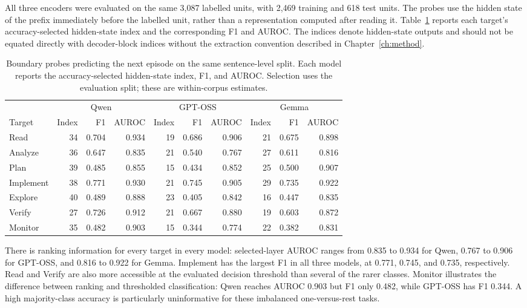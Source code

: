 \documentclass[12pt,a4paper,twoside,openright]{book}
\begin{document}
All three encoders were evaluated on the same 3,087 labelled units, with
2,469 training and 618 test units. The probes use the hidden state of the
prefix immediately before the labelled unit, rather than a representation
computed after reading it. Table~\ref{tab:res-probes} reports each target's
accuracy-selected hidden-state index and the corresponding F1 and AUROC.
The indices denote hidden-state outputs and should not be equated directly
with decoder-block indices without the extraction convention described in
Chapter~\ref{ch:method}.

\begin{table}[!ht]
\centering\small
\caption{Boundary probes predicting the next episode on the same sentence-level split. Each model reports the accuracy-selected hidden-state index, F1, and AUROC. Selection uses the evaluation split; these are within-corpus estimates.}
\label{tab:res-probes}
\begin{adjustbox}{max width=\linewidth}%
\begin{tabular}{lrrrrrrrrr}
\toprule
 & \multicolumn{3}{c}{Qwen} & \multicolumn{3}{c}{GPT-OSS} & \multicolumn{3}{c}{Gemma} \\ Target & Index & F1 & AUROC & Index & F1 & AUROC & Index & F1 & AUROC \\
\midrule
Read & 34 & 0.704 & 0.934 & 19 & 0.686 & 0.906 & 21 & 0.675 & 0.898 \\
Analyze & 36 & 0.647 & 0.835 & 21 & 0.540 & 0.767 & 27 & 0.611 & 0.816 \\
Plan & 39 & 0.485 & 0.855 & 15 & 0.434 & 0.852 & 25 & 0.500 & 0.907 \\
Implement & 38 & 0.771 & 0.930 & 21 & 0.745 & 0.905 & 29 & 0.735 & 0.922 \\
Explore & 40 & 0.489 & 0.888 & 23 & 0.405 & 0.842 & 16 & 0.447 & 0.835 \\
Verify & 27 & 0.726 & 0.912 & 21 & 0.667 & 0.880 & 19 & 0.603 & 0.872 \\
Monitor & 35 & 0.482 & 0.903 & 15 & 0.344 & 0.774 & 22 & 0.382 & 0.831 \\
\bottomrule
\end{tabular}
\end{adjustbox}
\end{table}


There is ranking information for every target in every model: selected-layer
AUROC ranges from 0.835 to 0.934 for Qwen, 0.767 to 0.906 for GPT-OSS, and
0.816 to 0.922 for Gemma. Implement has the largest F1 in all three models,
at 0.771, 0.745, and 0.735, respectively. Read and Verify are also more
accessible at the evaluated decision threshold than several of the rarer
classes. Monitor illustrates the difference between ranking and thresholded
classification: Qwen reaches AUROC 0.903 but F1 only 0.482, while GPT-OSS
has F1 0.344. A high majority-class accuracy is particularly uninformative
for these imbalanced one-versus-rest tasks.
\end{document}
